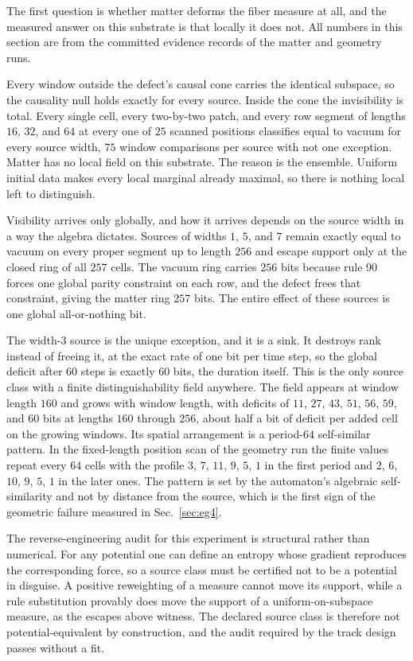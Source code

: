 \documentclass[aps,pre,reprint,nofootinbib]{revtex4-2}
\begin{document}
The first question is whether matter deforms the fiber measure at
all, and the measured answer on this substrate is that locally it
does not.  All numbers in this section are from the committed
evidence records of the matter and geometry runs.

Every window outside the defect's causal cone carries the identical
subspace, so the causality null holds exactly for every source.
Inside the cone the invisibility is total.  Every single cell, every
two-by-two patch, and every row segment of lengths $16$, $32$, and
$64$ at every one of $25$ scanned positions classifies equal to
vacuum for every source width, $75$ window comparisons per source
with not one exception.  Matter has no local field on this substrate.
The reason is the ensemble.  Uniform initial data makes every local
marginal already maximal, so there is nothing local left to
distinguish.

Visibility arrives only globally, and how it arrives depends on the
source width in a way the algebra dictates.  Sources of widths $1$,
$5$, and $7$ remain exactly equal to vacuum on every proper segment
up to length $256$ and escape support only at the closed ring of all
$257$ cells.  The vacuum ring carries $256$ bits because rule 90
forces one global parity constraint on each row, and the defect frees
that constraint, giving the matter ring $257$ bits.  The entire
effect of these sources is one global all-or-nothing bit.

The width-$3$ source is the unique exception, and it is a sink.  It
destroys rank instead of freeing it, at the exact rate of one bit per
time step, so the global deficit after $60$ steps is exactly $60$
bits, the duration itself.  This is the only source class with a
finite distinguishability field anywhere.  The field appears at
window length $160$ and grows with window length, with deficits of
$11$, $27$, $43$, $51$, $56$, $59$, and $60$ bits at lengths $160$
through $256$, about half a bit of deficit per added cell on the
growing windows.  Its spatial arrangement is a period-$64$
self-similar pattern.  In the fixed-length position scan of the
geometry run the finite
values repeat every $64$ cells with the profile $3$, $7$, $11$, $9$,
$5$, $1$ in the first period and $2$, $6$, $10$, $9$, $5$, $1$ in the
later ones.  The pattern is set by the automaton's algebraic
self-similarity and not by distance from the source, which is the
first sign of the geometric failure measured in
Sec.~\ref{sec:eg4}.

The reverse-engineering audit for this experiment is structural
rather than numerical.  For any potential one can define an entropy
whose gradient reproduces the corresponding force, so a source class
must be certified not to be a potential in disguise.  A positive
reweighting of a measure cannot move its support, while a rule
substitution provably does move the support of a uniform-on-subspace
measure, as the escapes above witness.  The declared source class is
therefore not potential-equivalent by construction, and the audit
required by the track design passes without a fit.
\end{document}
